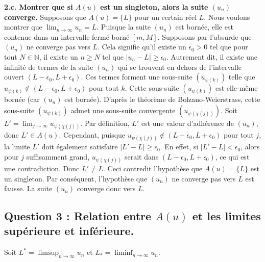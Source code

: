 \documentclass{report}
\begin{document}
\textbf{2.c. Montrer que si $A(u)$ est un singleton, alors la suite $(u_n)$ converge.}
Supposons que $A(u) = \{L\}$ pour un certain réel $L$.
Nous voulons montrer que $\lim_{n \to \infty} u_n = L$.
Puisque la suite $(u_n)$ est bornée, elle est contenue dans un intervalle fermé borné $[m, M]$.
Supposons par l'absurde que $(u_n)$ ne converge pas vers $L$.
Cela signifie qu'il existe un $\epsilon_0 > 0$ tel que pour tout $N \in \mathbb{N}$, il existe un $n \ge N$ tel que $|u_n - L| \ge \epsilon_0$.
Autrement dit, il existe une infinité de termes de la suite $(u_n)$ qui se trouvent en dehors de l'intervalle ouvert $(L-\epsilon_0, L+\epsilon_0)$.
Ces termes forment une sous-suite $(u_{\psi(k)})$ telle que $u_{\psi(k)} \notin (L-\epsilon_0, L+\epsilon_0)$ pour tout $k$.
Cette sous-suite $(u_{\psi(k)})$ est elle-même bornée (car $(u_n)$ est bornée).
D'après le théorème de Bolzano-Weierstrass, cette sous-suite $(u_{\psi(k)})$ admet une sous-suite convergente $(u_{\psi(\chi(j))})$.
Soit $L' = \lim_{j \to \infty} u_{\psi(\chi(j))}$. Par définition, $L'$ est une valeur d'adhérence de $(u_n)$, donc $L' \in A(u)$.
Cependant, puisque $u_{\psi(\chi(j))} \notin (L-\epsilon_0, L+\epsilon_0)$ pour tout $j$, la limite $L'$ doit également satisfaire $|L' - L| \ge \epsilon_0$.
En effet, si $|L' - L| < \epsilon_0$, alors pour $j$ suffisamment grand, $u_{\psi(\chi(j))}$ serait dans $(L-\epsilon_0, L+\epsilon_0)$, ce qui est une contradiction.
Donc $L' \ne L$.
Ceci contredit l'hypothèse que $A(u) = \{L\}$ est un singleton.
Par conséquent, l'hypothèse que $(u_n)$ ne converge pas vers $L$ est fausse.
La suite $(u_n)$ converge donc vers $L$.

\subsection*{Question 3 : Relation entre $A(u)$ et les limites supérieure et inférieure.}

Soit $L^* = \limsup_{n \to \infty} u_n$ et $L_* = \liminf_{n \to \infty} u_n$.
\end{document}
